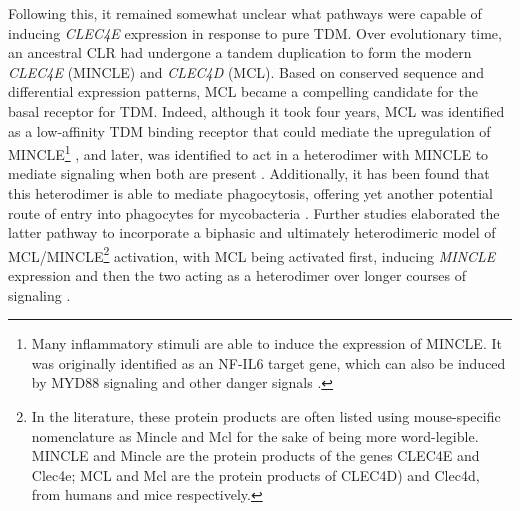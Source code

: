 Following this, it remained somewhat unclear what pathways were capable of inducing \textit{CLEC4E} expression in response to pure TDM. Over evolutionary time, an ancestral CLR had undergone a tandem duplication to form the modern \textit{CLEC4E} (MINCLE) and \textit{CLEC4D} (MCL). Based on conserved sequence and differential expression patterns, MCL became a compelling candidate for the basal receptor for TDM. Indeed, although it took four years, MCL was identified as a low\hyp{}affinity TDM binding receptor that could mediate the upregulation of MINCLE\footnote{Many inflammatory stimuli are able to induce the expression of MINCLE. It was originally identified as an NF\hyp{}IL6 target gene, which can also be induced by MYD88 signaling and other danger signals \citep{Kerscher2016b}.} \citep{Miyake2013}, and later, was identified to act in a heterodimer with MINCLE to mediate signaling when both are present \citep{LobatoPascual2013, Kerscher2016a, Yamasaki2013, Furukawa2013}. Additionally, it has been found that this heterodimer is able to mediate phagocytosis, offering yet another potential route of entry into phagocytes for mycobacteria \citep{Yamasaki2013, LobatoPascual2013}. Further studies elaborated the latter pathway to incorporate a biphasic and ultimately heterodimeric model of MCL/MINCLE\footnote{In the literature, these protein products are often listed using mouse\hyp{}specific nomenclature as Mincle and Mcl for the sake of being more word\hyp{}legible. MINCLE and Mincle are the protein products of the genes CLEC4E and Clec4e; MCL and Mcl are the protein products of CLEC4D) and Clec4d, from humans and mice respectively.} activation, with MCL being activated first, inducing \textit{MINCLE} expression and then the two acting as a heterodimer over longer courses of signaling \citep{LobatoPascual2013, Yamasaki2013, Furukawa2013}.

